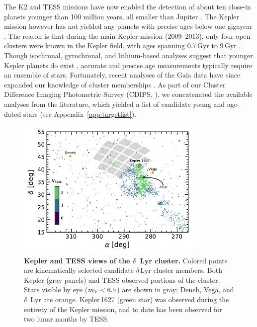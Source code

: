 \documentclass[12pt,modern,twocolumn,tighten]{aastex63}
\begin{document}
The K2 and TESS missions have now enabled the detection of about ten
close-in planets younger than 100 million years, all smaller than
Jupiter
\citep{Mann_K2_33b_2016,David_et_al_2017,david_four_2019,newton_tess_2019,bouma_cluster_2020,plavchan_planet_2020,rizzuto_tess_2020,martioli_aumicbc_2021}.
The Kepler mission however has not yielded any planets with precise
ages below one gigayear \citep{Meibom_et_al_2013}.  The reason is that
during the main Kepler mission (2009--2013), only four open clusters
were known in the Kepler field,
with ages spanning 0.7\,Gyr to 9\,Gyr
\citep{meibom_kepler_2011}.  Though isochronal, gyrochronal, and lithium-based
analyses suggest that younger Kepler planets do exist
\citep{berger_identifying_2018,david_sizes_2021}, accurate and precise
age measurements typically require an ensemble of stars.  Fortunately,
recent analyses of the Gaia
data have since expanded our knowledge of cluster memberships
\citep[{\it
e.g.},][]{cantatgaudin_gaia_2018,zari_3d_2018,kounkel_untangling_2019,Meingast2021,Kerr2021}.
As part of our Cluster Difference Imaging Photometric Survey (CDIPS,
\citealt{bouma_cdipsI_2019}), we concatenated the available analyses
from the literature, which yielded a list of candidate young and
age-dated stars (see Appendix~\ref{app:targetlist}).

\begin{figure}[t]
	\begin{center}
		\leavevmode
		\includegraphics[width=0.8\textwidth]{f2.pdf}
	\end{center}
	\vspace{-0.7cm}
	\caption{
		{\bf Kepler and TESS views of the $\delta$~Lyr cluster.} Colored
		points are kinematically selected candidate $\delta$\,Lyr cluster
		members.  Both Kepler (gray panels) and TESS observed portions of
		the cluster.  Stars visible by eye ($m_{\rm V}<6.5$) are shown in gray;
		Deneb, Vega, and $\delta$~Lyr are orange.  Kepler\,1627 (green star) was observed during the
		entirety of the Kepler mission, and to date has been observed for
		two lunar months by TESS.%
		\label{fig:skychart}
	}
\end{figure}
\end{document}
